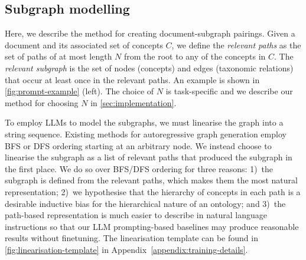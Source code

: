 \documentclass{article}
\newcommand{\fig}[1]{\textcolor{teal}{Figure: #1}}
\begin{document}
\subsection{Subgraph modelling}  \label{sec:method:subgraph}



Here, we describe the method for creating document-subgraph pairings. Given a document and its associated set of concepts $C$, we define the \emph{relevant paths} as the set of paths of at most length $N$ from the root to any of the concepts in $C$. The \emph{relevant subgraph} is the set of nodes (concepts) and edges (taxonomic relations) that occur at least once in the relevant paths. An example is shown in \cref{fig:prompt-example} (left). The choice of $N$ is task-specific and we describe our method for choosing $N$ in \cref{sec:implementation}.

To employ LLMs to model the subgraphs, we must linearise the graph into a string sequence. Existing methods for autoregressive graph generation employ BFS \cite{you2018graphrnn} or DFS \cite{goyal2020graphgen} ordering starting at an arbitrary node. We instead choose to linearise the subgraph as a list of relevant paths that produced the subgraph in the first place. We do so over BFS/DFS ordering for three reasons: 1)~the subgraph is defined from the relevant paths, which makes them the most natural representation; 2)~we hypothesise that the hierarchy of concepts in each path is a desirable inductive bias for the hierarchical nature of an ontology; and 3)~the path-based representation is much easier to describe in natural language instructions so that our LLM prompting-based baselines may produce reasonable results without finetuning. The linearisation template can be found in \cref{fig:linearisation-template} in Appendix~\ref{appendix:training-details}.

\end{document}
